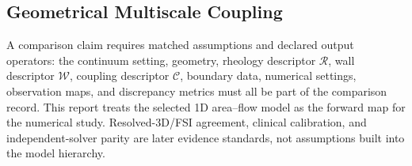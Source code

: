 



\subsection{Geometrical Multiscale Coupling}
\label{subsec:geometrical-multiscale-coupling}



A comparison claim requires matched assumptions and declared output operators:
the continuum setting, geometry, rheology descriptor $\mathcal R$, wall
descriptor $\mathcal W$, coupling descriptor $\mathcal C$, boundary data,
numerical settings, observation maps, and discrepancy metrics must all be part
of the comparison record. This report treats the selected 1D area--flow model
as the forward map for the numerical study. Resolved-3D/FSI agreement, clinical
calibration, and independent-solver parity are later evidence standards, not
assumptions built into the model hierarchy.
